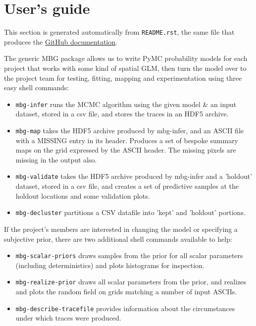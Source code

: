 \chapter{User's guide} 
\label{chap:user} 

This section is generated automatically from \texttt{README.rst}, the same file that produces the \href{github.com/malaria-atlas-project/generic-mbg}{GitHub documentation}. 




The generic MBG package allows us to write PyMC probability models for each
project that works with some kind of spatial GLM, then turn the model over
to the project team for testing, fitting, mapping and experimentation using
three easy shell commands:
\begin{itemize}
\item {} 
\texttt{mbg-infer} runs the MCMC algorithm using the given model {\&} an input dataset,
stored in a csv file, and stores the traces in an HDF5 archive.

\item {} 
\texttt{mbg-map} takes the HDF5 archive produced by mbg-infer, and an ASCII file with
a MISSING entry in its header. Produces a set of bespoke summary maps on the grid
expressed by the ASCII header. The missing pixels are missing in the output also.

\item {} 
\texttt{mbg-validate} takes the HDF5 archive produced by mbg-infer and a 'holdout'
dataset, stored in a csv file, and creates a set of predictive samples at the
holdout locations and some validation plots.

\item {} 
\texttt{mbg-decluster} partitions a CSV datafile into 'kept' and 'holdout' portions.

\end{itemize}

If the project's members are interested in changing the model or specifying a
subjective prior, there are two additional shell commands available to help:
\begin{itemize}
\item {} 
\texttt{mbg-scalar-priors} draws samples from the prior for all scalar parameters
(including deterministics) and plots histograms for inspection.

\item {} 
\texttt{mbg-realize-prior} draws all scalar parameters from the prior, and realizes
and plots the random field on grids matching a number of input ASCIIs.

\item {} 
\texttt{mbg-describe-tracefile} provides information about the circumstances under which
traces were produced.

\end{itemize}

